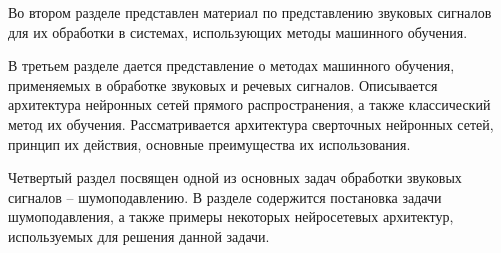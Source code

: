 Во втором разделе представлен материал по представлению звуковых сигналов для их обработки
в системах, использующих методы машинного обучения.

В третьем разделе дается представление о методах машинного обучения,
применяемых в обработке звуковых и речевых сигналов. 
Описывается архитектура нейронных сетей прямого распространения, а также классический метод их обучения.
Рассматривается архитектура сверточных нейронных сетей, принцип их действия,
основные преимущества их использования.

Четвертый раздел посвящен одной из основных задач обработки звуковых сигналов -- шумоподавлению.
В разделе содержится постановка задачи шумоподавления, а также примеры некоторых
нейросетевых архитектур, используемых для решения данной задачи. 